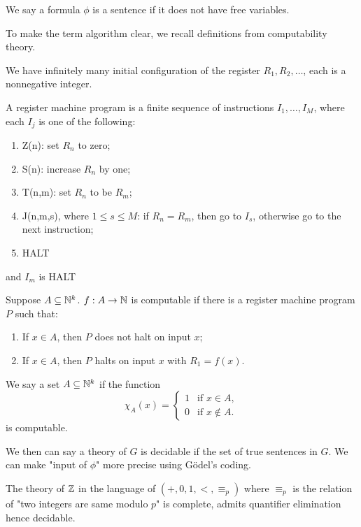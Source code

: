 \documentclass[../main.tex]{subfiles}
\begin{document}
\begin{definition}
    We say a formula $\phi$ is a sentence if it does not have free variables.
\end{definition}



To make the term algorithm clear, we recall definitions from computability theory.

We have infinitely many initial configuration of the register $R_1,R_2,\dots$, each is a nonnegative integer.

\begin{definition}
    A register machine program is a finite sequence of instructions $I_1,\dots,I_M$, where each $I_j$ is one of the following:\begin{enumerate}
        \item Z(n): set $R_n$ to zero;
        \item S(n): increase $R_n$ by one;
        \item T(n,m): set $R_n$ to be $R_m$;
        \item J(n,m,s), where $1\leq s\leq M$: if $R_n=R_m$, then go to $I_s$, otherwise go to the next instruction;
        \item HALT
    \end{enumerate}
    and $I_m$ is HALT
\end{definition}

\begin{definition}
    Suppose $A\subseteq \mathbb{N}^k$. $f:A\rightarrow \mathbb{N}$ is computable if there is a register machine program $P$ such that:\begin{enumerate}
        \item If $x\in A$, then $P$ does not halt on input $x$;
        \item If $x\in A$, then $P$ halts on input $x$ with $R_1=f(x)$.
    \end{enumerate}
\end{definition}

\begin{definition}
    We say a set $A\subseteq \mathbb{N}^k$ if the function\[
    \chi_A(x) = 
\begin{cases}
1 & \text{if } x \in A, \\
0 & \text{if } x \notin A.
\end{cases}
    \]
    is computable.
\end{definition}

We then can say a theory of $G$ is decidable if the set of true sentences in $G$. We can make "input of $\phi$" more precise using G\"odel's coding.

\begin{theorem}
    The theory of $\mathbb{Z}$ in the language of $(+,0,1,<,\equiv_p)$ where $\equiv_p$ is the relation of "two integers are same modulo $p$" is complete, admits quantifier elimination hence decidable.
\end{theorem}
\end{document}
